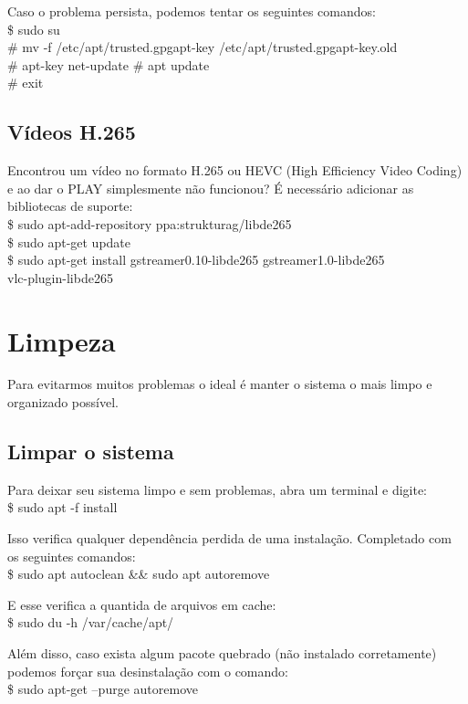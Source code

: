 Caso o problema persista, podemos tentar os seguintes comandos: \\
{\ttfamily\$ sudo su \\
\# mv -f /etc/apt/trusted.gpgapt-key /etc/apt/trusted.gpgapt-key.old \\
\# apt-key net-update
\# apt update \\
\# exit}

\subsection{Vídeos H.265}
Encontrou um vídeo no formato H.265 ou HEVC (High Efficiency Video Coding) e ao dar o PLAY simplesmente não funcionou? É necessário adicionar as bibliotecas de suporte: \\
{\ttfamily\$ sudo apt-add-repository ppa:strukturag/libde265 \\
\$ sudo apt-get update \\
\$ sudo apt-get install gstreamer0.10-libde265 gstreamer1.0-libde265 \\ vlc-plugin-libde265}

\section{Limpeza}
Para evitarmos muitos problemas o ideal é manter o sistema o mais limpo e organizado possível.

\subsection{Limpar o sistema}
Para deixar seu sistema limpo e sem problemas, abra um terminal e digite: \\
{\ttfamily\$ sudo apt -f install}

Isso verifica qualquer dependência perdida de uma instalação. Completado com os seguintes comandos: \\
{\ttfamily\$ sudo apt autoclean \&\& sudo apt autoremove}

E esse verifica a quantida de arquivos em cache: \\
{\ttfamily\$ sudo du -h /var/cache/apt/}

Além disso, caso exista algum pacote quebrado (não instalado corretamente) podemos forçar sua desinstalação com o comando: \\
{\ttfamily\$ sudo apt-get --purge autoremove}

